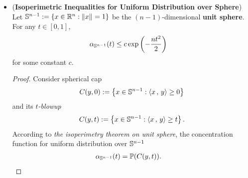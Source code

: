 \documentclass[11pt]{article}
\begin{document}
\begin{itemize}
\item \begin{proposition} (\textbf{Isoperimetric Inequalities for Uniform Distribution over Sphere})  \citep{boucheron2013concentration, vershynin2018high, wainwright2019high}\\
Let ${\mathbb S}^{n - 1} :=  \left\{x \in {\mathbb R}^n: \left\|x\right\|_{} = 1\right\}$ be the $(n-1)$-dimensional \textbf{unit sphere}.  For any $t\in [0, 1]$, 
\begin{align}
\alpha_{{\mathbb S}^{n-1}}(t) &\le c \exp\left(-\frac{n t^2}{2}\right) \label{ineqn: isoperimetric_inequality_uniform_unit_sphere}
\end{align} for some constant $c$.
\end{proposition}
\begin{proof}
Consider spherical cap 
\begin{align*}
C(y, 0) := \left\{x \in {\mathbb S}^{n-1}: \left\langle x\,,\, y \right\rangle \ge 0\right\}
\end{align*} and its  \emph{$t$-blowup}
\begin{align*}
C(y, t) :=  \left\{x \in {\mathbb S}^{n-1}: \left\langle x\,,\, y \right\rangle \ge t\right\}.
\end{align*} According to \emph{the isoperimetry theorem on unit sphere}, the concentration function for uniform distribution over ${\mathbb S}^{n-1}$
\begin{align*}
\alpha_{{\mathbb S}^{n-1}}(t) &= {\mathbb P}(C(y, t)).
\end{align*} 


\end{proof}
\end{itemize}
\end{document}
